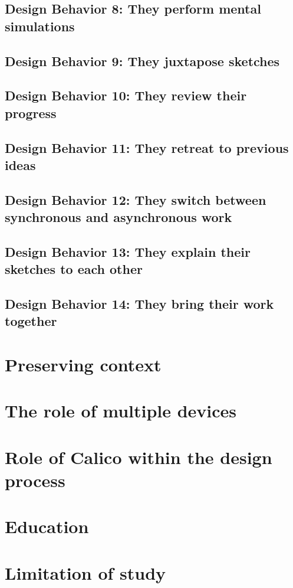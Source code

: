 \subsection{Design Behavior 8: They perform mental simulations}

\subsection{Design Behavior 9: They juxtapose sketches}

\subsection{Design Behavior 10: They review their progress}

\subsection{Design Behavior 11: They retreat to previous ideas}

\subsection{Design Behavior 12: They switch between synchronous and asynchronous work}

\subsection{Design Behavior 13: They explain their sketches to each other}

\subsection{Design Behavior 14: They bring their work together}

\section{Preserving context}

\section{The role of multiple devices}

\section{Role of Calico within the design process}

\section{Education}

\section{Limitation of study}


